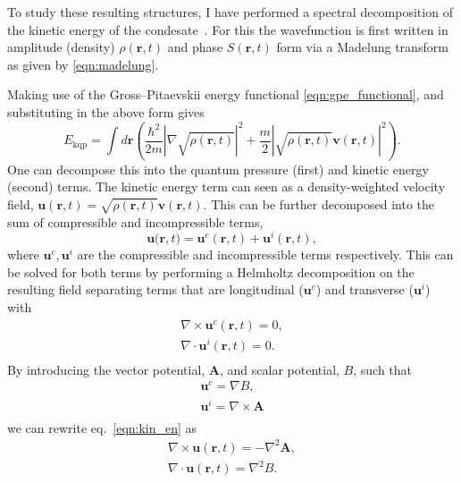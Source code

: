 To study these resulting structures, I have performed a spectral decomposition of the kinetic energy of the condesate~\cite{CT:Nore_prl_1997,CT:Nore_pof_1997,CT:Bradley_prx_2012}. For this the wavefunction is first written in amplitude (density) $\rho(\mathbf{r},t)$ and phase $S(\mathbf{r},t)$ form via a Madelung transform as given by \ref{eqn:madelung}.

Making use of the Gross--Pitaevskii energy functional \ref{eqn:gpe_functional}, and substituting in the above form gives
\begin{equation}
    E_{\text{kqp}} = \int d\mathbf{r} \left( \frac{\hbar^2}{2m}| \nabla\sqrt{\rho(\mathbf{r},t)} |^2  + \frac{m}{2}|\sqrt{\rho(\mathbf{r},t)}\mathbf{v}(\mathbf{r},t) |^2\right).
\end{equation}
One can decompose this into the quantum pressure (first) and kinetic energy (second) terms. The kinetic energy term can seen as a density-weighted velocity field, $\mathbf{u}(\mathbf{r},t) = \sqrt{\rho(\mathbf{r},t)}\mathbf{v}(\mathbf{r},t)$. This can be further decomposed into the sum of compressible and incompressible terms,
\begin{equation}\label{eqn:kin_en}
    \mathbf{u(r},t) = \mathbf{u}^c(\mathbf{r},t) + \mathbf{u}^i(\mathbf{r},t),
\end{equation}
where $\mathbf{u}^c, \mathbf{u}^i$ are the compressible and incompressible terms respectively. This can be solved for both terms by performing a Helmholtz decomposition on the resulting field separating terms that are longitudinal ($\mathbf{u}^c$) and transverse ($\mathbf{u}^i$) with
\begin{subequations}\label{eqn:kinterms}
\begin{align}
    \nabla \times \mathbf{u}^c(\mathbf{r},t) = 0, \\
    \nabla \cdot \mathbf{u}^i(\mathbf{r},t) = 0.\\
\end{align}
\end{subequations}
By introducing the vector potential, $\mathbf{A}$, and scalar potential, $B$, such that
\begin{subequations}
\begin{align}
    \mathbf{u}^c = \nabla B, \\
    \mathbf{u}^i = \nabla \times \mathbf{A} \\
\end{align}
\end{subequations}
we can rewrite eq.~\ref{eqn:kin_en} as
\begin{align}
    \nabla \times \mathbf{u}(\mathbf{r},t) = -\nabla^2 \mathbf{A}, \\
    \nabla \cdot \mathbf{u}(\mathbf{r},t) = \nabla^2 {B}. \\
\end{align}

